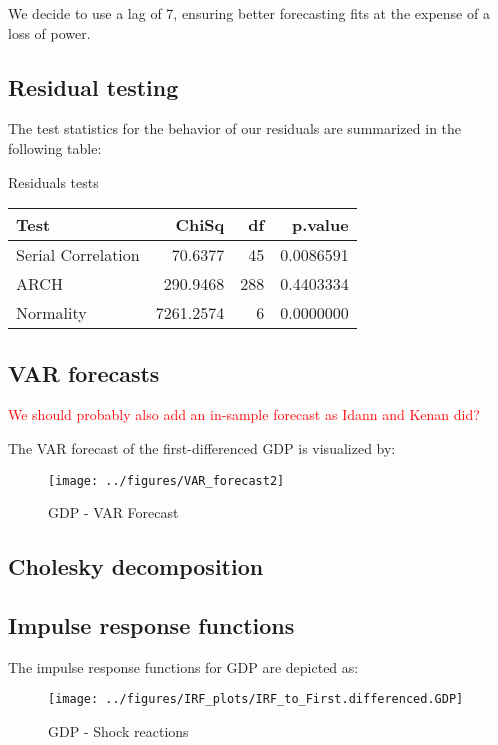 \documentclass[
]{article}
\begin{document}
We decide to use a lag of 7, ensuring better forecasting fits at the
expense of a loss of power.

\subsection{Residual testing}

The test statistics for the behavior of our residuals are summarized in
the following table:

\bgroup \table[H]
\centering
\caption{\label{tab:unnamed-chunk-22}Residuals tests}
\centering
\begin{tabular}[t]{lrrr}
\toprule
Test & ChiSq & df & p.value\\
\midrule
Serial Correlation & 70.6377 & 45 & 0.0086591\\
ARCH & 290.9468 & 288 & 0.4403334\\
Normality & 7261.2574 & 6 & 0.0000000\\
\bottomrule
\end{tabular}
\endtable\egroup

\subsection{VAR forecasts}

\textcolor{red}{We should probably also add an in-sample forecast as Idann and Kenan did?}

The VAR forecast of the first-differenced GDP is visualized by:

\begin{figure}

{\centering \texttt{[image: ../figures/VAR\_forecast2]} 

}

\caption{GDP - VAR Forecast}\label{fig:unnamed-chunk-23}
\end{figure}

\subsection{Cholesky decomposition}

\subsection{Impulse response functions}

The impulse response functions for GDP are depicted as:

\begin{figure}

{\centering \texttt{[image: ../figures/IRF\_plots/IRF\_to\_First.differenced.GDP]} 

}

\caption{GDP - Shock reactions}\label{fig:unnamed-chunk-24}
\end{figure}
\end{document}
